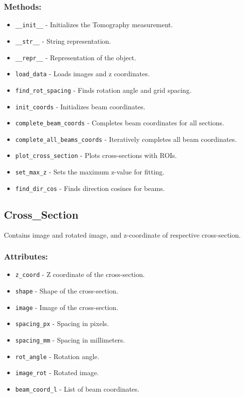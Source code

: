 \documentclass{article}
\begin{document}
\subsubsection*{Methods:}
\begin{itemize}
    \item \texttt{\_\_init\_\_} - Initializes the Tomography measurement.
    \item \texttt{\_\_str\_\_} - String representation.
    \item \texttt{\_\_repr\_\_} - Representation of the object.
    \item \texttt{load\_data} - Loads images and z coordinates.
    \item \texttt{find\_rot\_spacing} - Finds rotation angle and grid spacing.
    \item \texttt{init\_coords} - Initializes beam coordinates.
    \item \texttt{complete\_beam\_coords} - Completes beam coordinates for all sections.
    \item \texttt{complete\_all\_beams\_coords} - Iteratively completes all beam coordinates.
    \item \texttt{plot\_cross\_section} - Plots cross-sections with ROIs.
    \item \texttt{set\_max\_z} - Sets the maximum z-value for fitting.
    \item \texttt{find\_dir\_cos} - Finds direction cosines for beams.
\end{itemize}

\subsection{Cross\_Section}
Contains image and rotated image, and z-coordinate of respective cross-section.
\subsubsection*{Attributes:}
\begin{itemize}
    \item \texttt{z\_coord} - Z coordinate of the cross-section.
    \item \texttt{shape} - Shape of the cross-section.
    \item \texttt{image} - Image of the cross-section.
    \item \texttt{spacing\_px} - Spacing in pixels.
    \item \texttt{spacing\_mm} - Spacing in millimeters.
    \item \texttt{rot\_angle} - Rotation angle.
    \item \texttt{image\_rot} - Rotated image.
    \item \texttt{beam\_coord\_l} - List of beam coordinates.
\end{itemize}
\end{document}
